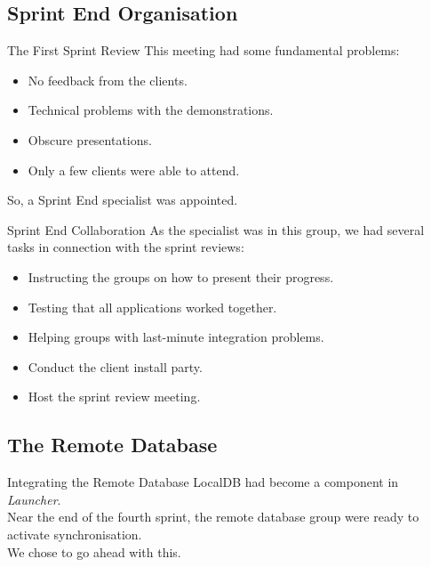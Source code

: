 \subsection{Sprint End Organisation}

\begin{frame}{The First Sprint Review}
	This meeting had some fundamental problems:
	\begin{itemize}
		\item No feedback from the clients.
		\item Technical problems with the demonstrations.
		\item Obscure presentations.
		\item Only a few clients were able to attend.
	\end{itemize}
	So, a Sprint End specialist was appointed.
\end{frame}

\begin{frame}{Sprint End Collaboration}
	As the specialist was in this group, we had several tasks in connection with the sprint reviews:
	\begin{itemize}
		\item Instructing the groups on how to present their progress.
		\item Testing that all applications worked together.
		\item Helping groups with last-minute integration problems.
		\item Conduct the client install party.
		\item Host the sprint review meeting.
	\end{itemize}
\end{frame}


\subsection{The Remote Database}

\begin{frame}{Integrating the Remote Database}
	LocalDB had become a component in \textit{Launcher}.\\
	\vspace{\baselineskip}
	Near the end of the fourth sprint, the remote database group were ready to activate synchronisation.\\
	\vspace{\baselineskip}
	We chose to go ahead with this.
\end{frame}

